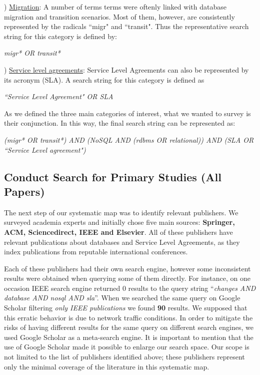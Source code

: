 \documentclass{article}
\begin{document}
) \underline{Migration}: A number of terms terms were oftenly linked with database migration and transition scenarios. Most of them, however, are consistently represented by the radicals ``migr" and ``transit". Thus the representative search string for this category is defined by: 


\begin{center}
\textit{migr* OR transit*}
\end{center}


) \underline{Service level agreements}: Service Level Agreements can also be represented by its acronym (SLA). 
A search string for this category is defined as 
\begin{center}
\textit{``Service Level Agreement" OR SLA}
\end{center}

As we defined the three main categories of interest, what we wanted to survey is their conjunction. 
In this way, the final search string can be represented as: 

\begin{center}
\textit{(migr* OR transit*) AND (NoSQL AND (rdbms OR relational)) AND (SLA OR ``Service Level agreement") 
}\end{center}

\subsection{Conduct Search for Primary Studies (All Papers)}
\label{sec:allPapers}

The next step of our systematic map was to identify relevant publishers. We surveyed academia experts and initially chose five main sources: \textbf{Springer, ACM, Sciencedirect, IEEE and Elsevier}. 
All of these publishers have relevant publications about databases and Service Level Agreements, as they index publications from reputable international conferences.  

Each of these publishers had their own search engine, however some inconsistent results were obtained when querying some of them directly.
For instance, on one occasion IEEE search engine returned 0 results to the query string ``\textit{changes AND database AND nosql AND sla}''. 
When we searched the same query on Google Scholar filtering \textit{only IEEE publications} we found \textbf{90} results.
We supposed that this erratic behavior is due to network traffic conditions.
In order to mitigate the risks of having different results for the same query on different search engines, we used Google Scholar as a meta-search engine. 
It is important to mention that the use of Google Scholar made it possible to enlarge our search space.
Our scope is not limited to the list of publishers identified above; these publishers represent only the minimal coverage of the literature in this systematic map.
\end{document}
